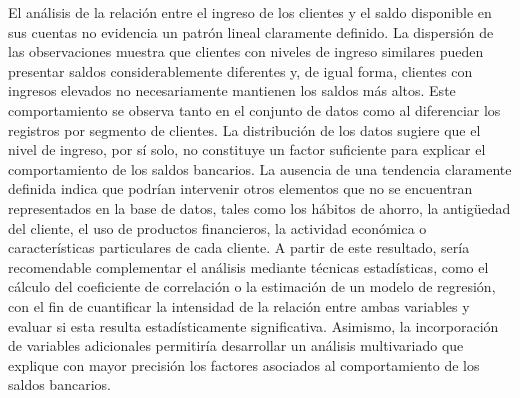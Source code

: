 El análisis de la relación entre el ingreso de los clientes y el saldo disponible en sus cuentas no evidencia un patrón lineal claramente definido. La dispersión de las observaciones muestra que clientes con niveles de ingreso similares pueden presentar saldos considerablemente diferentes y, de igual forma, clientes con ingresos elevados no necesariamente mantienen los saldos más altos. Este comportamiento se observa tanto en el conjunto de datos como al diferenciar los registros por segmento de clientes.
La distribución de los datos sugiere que el nivel de ingreso, por sí solo, no constituye un factor suficiente para explicar el comportamiento de los saldos bancarios. La ausencia de una tendencia claramente definida indica que podrían intervenir otros elementos que no se encuentran representados en la base de datos, tales como los hábitos de ahorro, la antigüedad del cliente, el uso de productos financieros, la actividad económica o características particulares de cada cliente.
A partir de este resultado, sería recomendable complementar el análisis mediante técnicas estadísticas, como el cálculo del coeficiente de correlación o la estimación de un modelo de regresión, con el fin de cuantificar la intensidad de la relación entre ambas variables y evaluar si esta resulta estadísticamente significativa. Asimismo, la incorporación de variables adicionales permitiría desarrollar un análisis multivariado que explique con mayor precisión los factores asociados al comportamiento de los saldos bancarios.